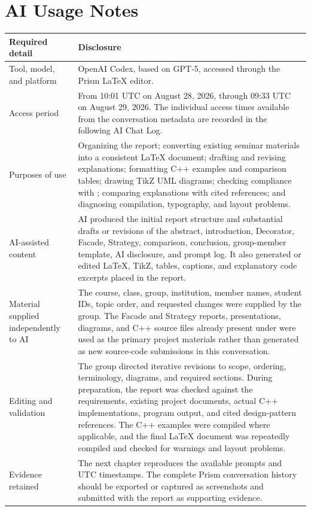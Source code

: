 \documentclass[11pt,a4paper]{report}
\begin{document}
\section{AI Usage Notes}
\begin{tabularx}{\textwidth}{@{}lY@{}}
\toprule
\textbf{Required detail} & \textbf{Disclosure} \\
\midrule
Tool, model, and platform & OpenAI Codex, based on GPT-5, accessed through the
Prism \LaTeX{} editor. \\

Access period & From 10:01 UTC on August 28, 2026, through 09:33 UTC on
August 29, 2026. The individual access times available from the conversation
metadata are recorded in the following AI Chat Log. \\

Purposes of use & Organizing the report; converting existing seminar materials
into a consistent \LaTeX{} document; drafting and revising explanations;
formatting C++ examples and comparison tables; drawing TikZ UML diagrams;
checking compliance with ; comparing explanations
with cited references; and diagnosing compilation, typography, and layout
problems. \\

AI-assisted content & AI produced the initial report structure and substantial
drafts or revisions of the abstract, introduction, Decorator, Facade, Strategy,
comparison, conclusion, group-member template, AI disclosure, and prompt log.
It also generated or edited \LaTeX{}, TikZ, tables, captions, and explanatory
code excerpts placed in the report. \\

Material supplied independently to AI & The course, class, group, institution,
member names, student IDs, topic order, and requested changes were supplied by
the group. The Facade and Strategy reports, presentations, diagrams, and C++
source files already present under  were used as the primary
project materials rather than generated as new source-code submissions in this
conversation. \\

Editing and validation & The group directed iterative revisions to scope,
ordering, terminology, diagrams, and required sections. During preparation, the
report was checked against the requirements, existing project documents, actual
C++ implementations, program output, and cited design-pattern references. The
C++ examples were compiled where applicable, and the final \LaTeX{} document
was repeatedly compiled and checked for warnings and layout problems. \\

Evidence retained & The next chapter reproduces the available prompts and UTC
timestamps. The complete Prism conversation history should be exported or
captured as screenshots and submitted with the report as supporting evidence. \\
\bottomrule
\end{tabularx}
\end{document}
